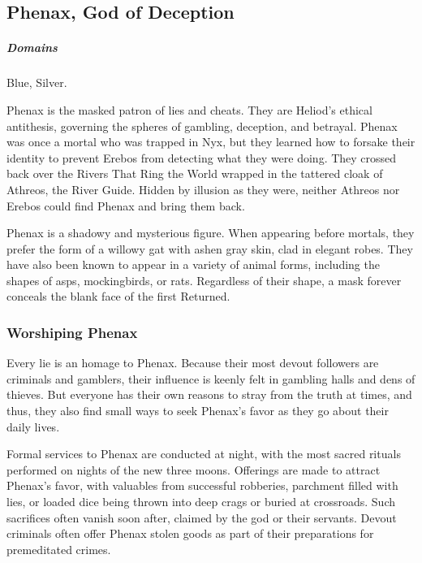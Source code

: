 \subsection*{Phenax, God of Deception} \label{ssec::phenax}
    \subparagraph{Domains} Blue, Silver.

    Phenax is the masked patron of lies and cheats.
    They are Heliod's ethical antithesis, governing the spheres of gambling, deception, and betrayal.
    Phenax was once a mortal who was trapped in Nyx, but they learned how to forsake their identity to prevent Erebos from detecting what they were doing.
    They crossed back over the Rivers That Ring the World wrapped in the tattered cloak of Athreos, the River Guide.
    Hidden by illusion as they were, neither Athreos nor Erebos could find Phenax and bring them back.


    Phenax is a shadowy and mysterious figure.
    When appearing before mortals, they prefer the form of a willowy gat with ashen gray skin, clad in elegant robes.
    They have also been known to appear in a variety of animal forms, including the shapes of asps, mockingbirds, or rats.
    Regardless of their shape, a mask forever conceals the blank face of the first Returned.


    \subsubsection{Worshiping Phenax}
        Every lie is an homage to Phenax.
        Because their most devout followers are criminals and gamblers, their influence is keenly felt in gambling halls and dens of thieves.
        But everyone has their own reasons to stray from the truth at times, and thus, they also find small ways to seek Phenax's favor as they go about their daily lives.

        Formal services to Phenax are conducted at night, with the most sacred rituals performed on nights of the new three moons.
        Offerings are made to attract Phenax's favor, with valuables from successful robberies, parchment filled with lies, or loaded dice being thrown into deep crags or buried at crossroads.
        Such sacrifices often vanish soon after, claimed by the god or their servants.
        Devout criminals often offer Phenax stolen goods as part of their preparations for premeditated crimes.

